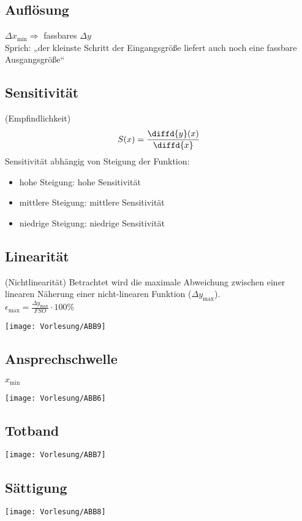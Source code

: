 \documentclass{scrreprt}
\begin{document}
\subsection{Auflösung}
$\Delta x_{\text{min}} \Rightarrow$ fassbares $\Delta y$\\
Sprich: „der kleinste Schritt der Eingangsgröße liefert auch noch eine fassbare Ausgangsgröße“

\subsection{Sensitivität} (Empfindlichkeit)
$$S(x)=\frac{\diffd{y}(x)}{\diffd{x}}$$
Sensitivität abhängig von Steigung der Funktion:
\begin{itemize}
\item hohe Steigung: hohe Sensitivität
\item mittlere Steigung: mittlere Sensitivität
\item niedrige Steigung: niedrige Sensitivität
\end{itemize}
\subsection{Linearität} (Nichtlinearität)
Betrachtet wird die maximale Abweichung zwischen einer linearen Näherung einer nicht-linearen Funktion ($\Delta y_{\text{max}}$).\\
$\epsilon_{\text{max}}=\frac{\Delta y_{\text{max}}}{FSO}\cdot 100 \%$
\begin{center}
\texttt{[image: Vorlesung/ABB9]}
\end{center}

\subsection{Ansprechschwelle}
$x_{\text{min}}$
\begin{center}
\texttt{[image: Vorlesung/ABB6]}
\end{center}
\subsection{Totband}
\begin{center}
\texttt{[image: Vorlesung/ABB7]}
\end{center}
\subsection{Sättigung}
\begin{center}
\texttt{[image: Vorlesung/ABB8]}
\end{center}
\end{document}
